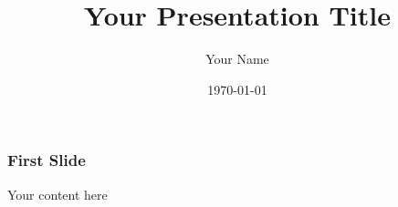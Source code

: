 \documentclass{beamer}
\title{Your Presentation Title}
\author{Your Name}
\date{\today}
\begin{document}
\frame{\titlepage}

\begin{frame}
\frametitle{First Slide}
Your content here
\end{frame}
\end{document}
